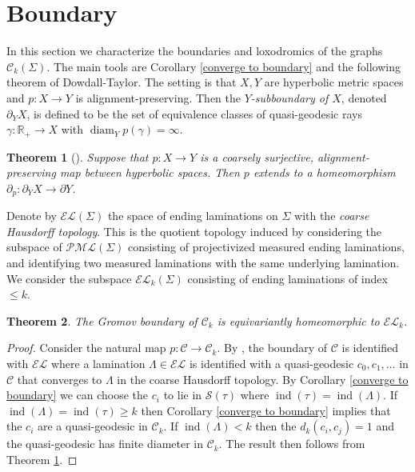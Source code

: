 \documentclass[11pt]{article}
\newtheorem{thm}{Theorem}[section]
\theoremstyle{remark}
\def\R{{\mathbb R}}
\def\S{{\mathcal S}}
\def\diam{\operatorname{diam}}
\def\C{{\mathcal C}}
\def\ind{\operatorname{ind}}
\begin{document}
\section{Boundary}

In this section we characterize the boundaries and loxodromics of the graphs
$\mathcal C_k(\Sigma)$. The main tools are Corollary \ref{converge to boundary} and the following theorem of Dowdall-Taylor.
The setting is that $X,Y$ are hyperbolic metric spaces and $p:X\to Y$ is
alignment-preserving. Then the \emph{$Y$-subboundary of $X$}, denoted $\partial_Y X$, is defined to be the
set of equivalence classes of quasi-geodesic rays $\gamma:\R_+\to X$ with
$\diam_Y p(\gamma) = \infty$.

\begin{thm}[{\cite[Theorem 3.2]{DT}}]
  \label{DT}
  Suppose that $p:X\to Y$ is a coarsely surjective, alignment-preserving map
  between hyperbolic spaces. Then $p$ extends to a homeomorphism
  $\partial_p : \partial_Y X \to \partial Y$.
\end{thm}

Denote by $\mathcal{EL}(\Sigma)$ the space of ending laminations on $\Sigma$
with the \emph{coarse Hausdorff topology}. This is the quotient topology
induced by considering the subspace of $\mathcal{PML}(\Sigma)$ consisting
of projectivized measured ending laminations, and identifying two measured
laminations with the same underlying lamination. 
We consider the subspace $\mathcal{EL}_k(\Sigma)$ consisting of ending laminations
of index $\leq k$.

\begin{thm}
  \label{boundary}
  The Gromov boundary of $\C_k$ is equivariantly homeomorphic to
  $\mathcal{EL}_k$.
\end{thm}

\begin{proof}
  Consider the natural map
  $p:\mathcal C \to \mathcal C_k$. By \cite{HamenstadtTT},
  the boundary of
  $\C$ is identified with $\mathcal{EL}$ where a lamination $\Lambda \in \mathcal{EL}$ is identified with a quasi-geodesic $c_0, c_1, \dots$ in $\C$ that converges to $\Lambda$ in the coarse Hausdorff topology. By Corollary \ref{converge to boundary} we can choose the $c_i$ to lie in $\S(\tau)$ where $\ind(\tau) = \ind(\Lambda)$. If $\ind(\Lambda) = \ind(\tau) \ge k$ then Corollary \ref{converge to boundary} implies that the $c_i$ are a quasi-geodesic in $\C_k$. If $\ind(\Lambda) < k$ then the $d_k(c_i, c_j) = 1$  and the quasi-geodesic has finite diameter in $\C_k$. The result then follows from Theorem \ref{DT}.
  \end{proof}
\end{document}
